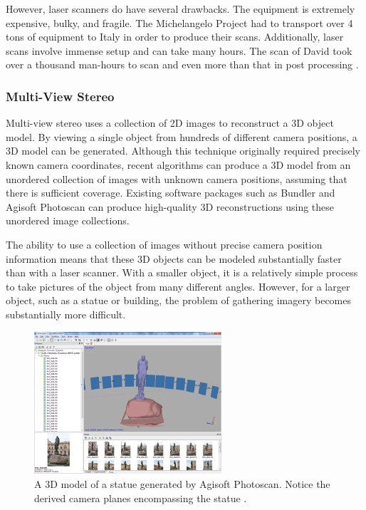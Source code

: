 However, laser scanners do have several drawbacks. The equipment is extremely expensive, bulky, and fragile. The Michelangelo Project had to transport over 4 tons of equipment to Italy in order to produce their scans. Additionally, laser scans involve immense setup and can take many hours. The scan of David took over a thousand man-hours to scan and even more than that in post processing \cite{Levoy}.

\subsubsection{Multi-View Stereo}
Multi-view stereo uses a collection of 2D images to reconstruct a 3D object model. By viewing a single object from hundreds of different camera positions, a 3D model can be generated. Although this technique originally required precisely known camera coordinates, recent algorithms can produce a 3D model from an unordered collection of images with unknown camera positions, assuming that there is sufficient coverage. Existing software packages such as Bundler and Agisoft Photoscan can produce high-quality 3D reconstructions using these unordered image collections. \cite{bundler}\cite{photoscan}

The ability to use a collection of images without precise camera position information means that these 3D objects can be modeled substantially faster than with a laser scanner. With a smaller object, it is a relatively simple process to take pictures of the object from many different angles. However, for a larger object, such as a statue or building, the problem of gathering imagery becomes substantially more difficult.

\begin{figure}
\centering
\includegraphics[height=200px]{../images/photoscan.png}
\caption{A 3D model of a statue generated by Agisoft Photoscan. Notice the derived camera planes encompassing the statue \cite{photoscan}.}
\end{figure}

